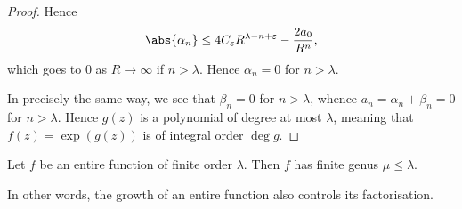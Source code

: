 \begin{proof}
	Hence
	\[
		\abs{\alpha_n} \leq 4 C_\varepsilon R^{\lambda - n + \varepsilon} - \frac{2 a_0}{R^n},
	\]
	which goes to $0$ as $R \to \infty$ if $n > \lambda$.
	Hence $\alpha_n = 0$ for $n > \lambda$.

	In precisely the same way, we see that $\beta_n = 0$ for $n > \lambda$, whence $a_n = \alpha_n + \beta_n = 0$ for $n > \lambda$.
	Hence $g(z)$ is a polynomial of degree at most $\lambda$, meaning that $f(z) = \exp(g(z))$ is of integral order $\deg g$.
\end{proof}

\begin{theorem}\label{thm8.15}
	Let $f$ be an entire function of finite order $\lambda$.
	Then $f$ has finite genus $\mu \leq \lambda$.
\end{theorem}

In other words, the growth of an entire function also controls its factorisation.

